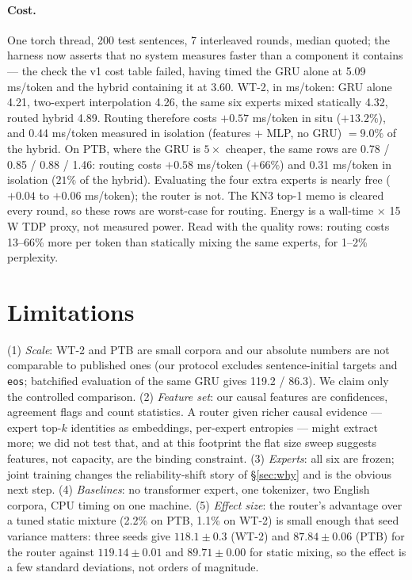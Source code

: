 \documentclass[11pt]{article}
\begin{document}
\paragraph{Cost.} One torch thread, 200 test sentences, 7 interleaved rounds,
median quoted; the harness now asserts that no system measures faster than a
component it contains --- the check the v1 cost table failed, having timed the
GRU alone at 5.09\,ms/token and the hybrid containing it at 3.60. WT-2, in
ms/token: GRU alone 4.21, two-expert interpolation 4.26, the same six experts
mixed statically 4.32, routed hybrid 4.89. Routing therefore costs $+0.57$
ms/token in situ ($+13.2\%$), and 0.44 ms/token measured in isolation
(features $+$ MLP, no GRU) $=9.0\%$ of the hybrid. On PTB, where the GRU is
$5\times$ cheaper, the same rows are 0.78 / 0.85 / 0.88 / 1.46: routing costs
$+0.58$ ms/token ($+66\%$) and 0.31 ms/token in isolation ($21\%$ of the
hybrid). Evaluating the four extra experts is nearly free ($+0.04$ to $+0.06$
ms/token); the router is not. The KN3 top-1 memo is cleared every round, so
these rows are worst-case for routing. Energy is a wall-time $\times$ 15\,W TDP
proxy, not measured power. Read with the quality rows: routing costs 13--66\%
more per token than statically mixing the same experts, for 1--2\% perplexity.

\section{Limitations}

(1) \emph{Scale}: WT-2 and PTB are small corpora and our absolute numbers are
not comparable to published ones (our protocol excludes sentence-initial
targets and \texttt{eos}; batchified evaluation of the same GRU gives 119.2 /
86.3). We claim only the controlled comparison. (2) \emph{Feature set}: our
causal features are confidences, agreement flags and count statistics. A router
given richer causal evidence --- expert top-$k$ identities as embeddings,
per-expert entropies --- might extract more; we did not test that, and at this
footprint the flat size sweep suggests features, not capacity, are the
binding constraint. (3) \emph{Experts}: all six are frozen; joint training
changes the reliability-shift story of \S\ref{sec:why} and is the obvious next
step. (4) \emph{Baselines}: no transformer expert, one tokenizer, two English
corpora, CPU timing on one machine. (5) \emph{Effect size}: the router's
advantage over a tuned static mixture (2.2\% on PTB, 1.1\% on WT-2) is small
enough that seed variance matters: three seeds give $118.1\pm0.3$ (WT-2) and
$87.84\pm0.06$ (PTB) for the router against $119.14\pm0.01$ and
$89.71\pm0.00$ for static mixing, so the effect is a few standard deviations,
not orders of magnitude.
\end{document}
